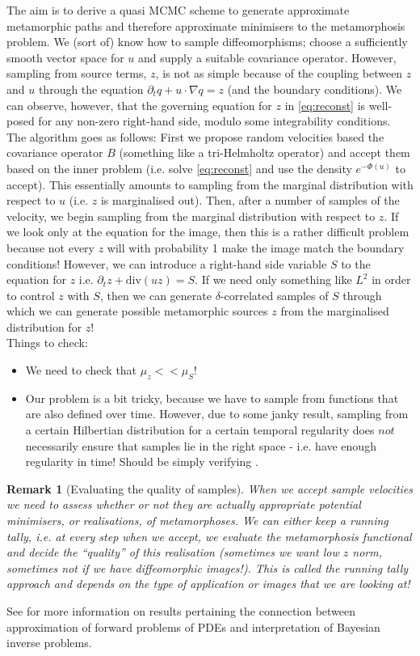 \documentclass{article}
\newtheorem{remark}{Remark}
\begin{document}
The aim is to derive a quasi MCMC scheme to generate approximate metamorphic
paths and therefore
approximate minimisers to the metamorphosis problem. We (sort of) know how to
sample diffeomorphisms; choose a sufficiently smooth vector space for $u$ and
supply a suitable covariance operator. However, sampling from source terms, $z$,
is not as simple because of the coupling between $z$ and $u$ through the
equation $\partial_t q + u\cdot\nabla q = z$ (and the boundary conditions).  We
can observe, however, that the governing equation for $z$ in \eqref{eq:reconst}
is well-posed for any non-zero right-hand side, modulo some integrability
conditions. The algorithm goes as follows: First we propose random velocities
based the covariance operator $B$ (something like a tri-Helmholtz operator) and
accept them based on the inner problem (i.e.  solve \eqref{eq:reconst} and use
the density $e^{-\Phi(u)}$ to accept). This essentially amounts to sampling from
the marginal distribution with respect to $u$ (i.e. $z$ is marginalised out).
Then, after a number of samples of the velocity, we begin sampling from the
marginal distribution with respect to $z$. If we look only at the equation for
the image, then this is a rather difficult problem because not every $z$ will
with probability 1 make the image match the boundary conditions! However, we
can introduce a right-hand side variable $S$ to the equation for $z$ i.e.
$\partial_t z + \text{div}(u z) = S$. If we need only something like $L^2$ in
order to control $z$ with $S$, then we can generate $\delta$-correlated samples
of $S$ through which we can generate possible metamorphic sources $z$ from the
marginalised distribution for $z$!\\

Things to check:
\begin{itemize}
\item We need to check that $\mu_z << \mu_S$!
\item  Our problem is a bit tricky, because we have to sample from functions
that are also defined over time. However, due to some janky result, sampling
from a certain Hilbertian distribution for a certain temporal regularity does
$not$ necessarily ensure that samples lie in the right space - i.e. have enough
regularity in time! Should be simply verifying \cite[Assumption 2.17, Theorem
2.18]{dashti2017bayesian}.
\end{itemize}

\begin{remark}[Evaluating the quality of samples]
When we accept sample velocities we need to
assess whether or not they are actually appropriate potential minimisers, or
realisations, of metamorphoses. We can either keep a running tally, i.e. at
every step when we accept, we evaluate the metamorphosis functional and decide
the ``quality'' of this realisation (sometimes we want low $z$ norm, sometimes
not if we have diffeomorphic images!). This is called the running tally
approach and depends on the type of application or images that we are looking
at!
\end{remark}

See \cite{cotter2010approximation} for more information on results pertaining
the connection between approximation of forward problems of PDEs and
interpretation of Bayesian inverse problems.



\end{document}
